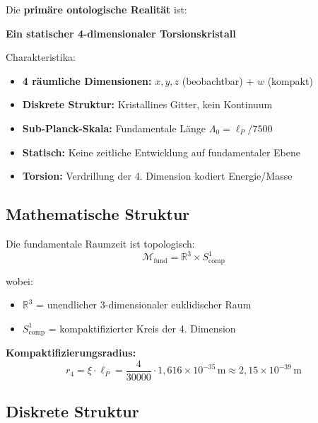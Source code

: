	\begin{keyresult}
		Die \textbf{primäre ontologische Realität} ist:
		
		\begin{center}
			\textbf{Ein statischer 4-dimensionaler Torsionskristall}
		\end{center}
		
		\vspace{0.3cm}
		
		Charakteristika:
		\begin{itemize}
			\item \textbf{4 räumliche Dimensionen:} $x, y, z$ (beobachtbar) + $w$ (kompakt)
			\item \textbf{Diskrete Struktur:} Kristallines Gitter, kein Kontinuum
			\item \textbf{Sub-Planck-Skala:} Fundamentale Länge $\Lambda_0 = \ell_P/7500$
			\item \textbf{Statisch:} Keine zeitliche Entwicklung auf fundamentaler Ebene
			\item \textbf{Torsion:} Verdrillung der 4. Dimension kodiert Energie/Masse
		\end{itemize}
	\end{keyresult}
	
	\subsection{Mathematische Struktur}
	
	Die fundamentale Raumzeit ist topologisch:
	\begin{equation}
		\boxed{\mathcal{M}_{\text{fund}} = \mathbb{R}^3 \times S^1_{\text{comp}}}
	\end{equation}
	
	wobei:
	\begin{itemize}
		\item $\mathbb{R}^3$ = unendlicher 3-dimensionaler euklidischer Raum
		\item $S^1_{\text{comp}}$ = kompaktifizierter Kreis der 4. Dimension
	\end{itemize}
	
	\textbf{Kompaktifizierungsradius:}
	\begin{equation}
		r_4 = \xi \cdot \ell_P = \frac{4}{30000} \cdot 1{,}616 \times 10^{-35}\,\text{m} \approx 2{,}15 \times 10^{-39}\,\text{m}
	\end{equation}
	
	\subsection{Diskrete Struktur}
	
